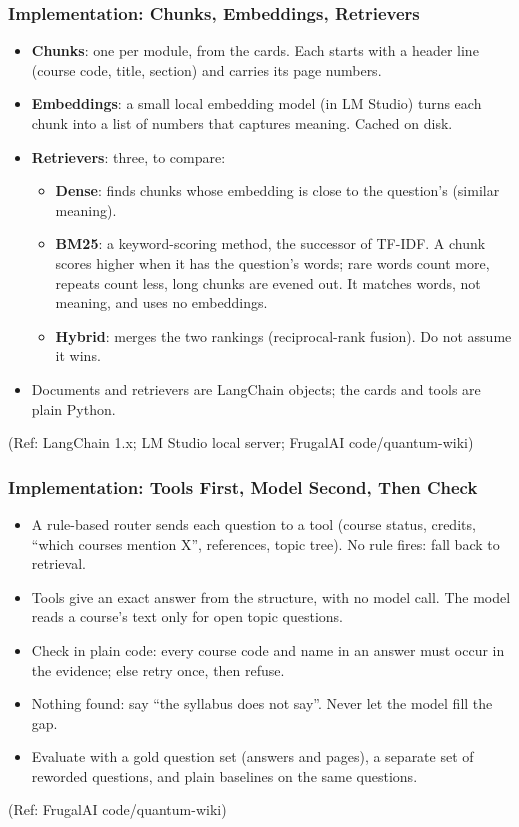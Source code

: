 \begin{frame}[fragile]\frametitle{Implementation: Chunks, Embeddings, Retrievers}
\begin{itemize}
\item \textbf{Chunks}: one per module, from the cards. Each starts with a header line (course code, title, section) and carries its page numbers.
\item \textbf{Embeddings}: a small local embedding model (in LM Studio) turns each chunk into a list of numbers that captures meaning. Cached on disk.
\item \textbf{Retrievers}: three, to compare:
	\begin{itemize}
	\item \textbf{Dense}: finds chunks whose embedding is close to the question's (similar meaning).
	\item \textbf{BM25}: a keyword-scoring method, the successor of TF-IDF. A chunk scores higher when it has the question's words; rare words count more, repeats count less, long chunks are evened out. It matches words, not meaning, and uses no embeddings.
	\item \textbf{Hybrid}: merges the two rankings (reciprocal-rank fusion). Do not assume it wins.
	\end{itemize}
\item Documents and retrievers are LangChain objects; the cards and tools are plain Python.
\end{itemize}
{\tiny (Ref: LangChain 1.x; LM Studio local server; FrugalAI code/quantum-wiki)}
\end{frame}

\begin{frame}[fragile]\frametitle{Implementation: Tools First, Model Second, Then Check}
\begin{itemize}
\item A rule-based router sends each question to a tool (course status, credits, ``which courses mention X'', references, topic tree). No rule fires: fall back to retrieval.
\item Tools give an exact answer from the structure, with no model call. The model reads a course's text only for open topic questions.
\item Check in plain code: every course code and name in an answer must occur in the evidence; else retry once, then refuse.
\item Nothing found: say ``the syllabus does not say''. Never let the model fill the gap.
\item Evaluate with a gold question set (answers and pages), a separate set of reworded questions, and plain baselines on the same questions.
\end{itemize}
{\tiny (Ref: FrugalAI code/quantum-wiki)}
\end{frame}
